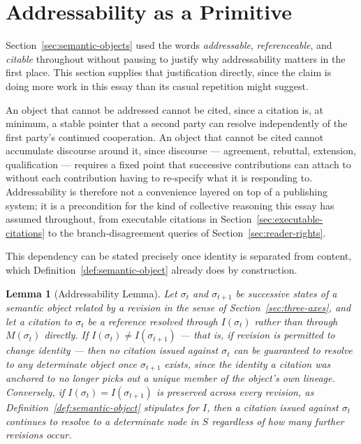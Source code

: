 \documentclass[11pt]{article}
\newtheorem{lemma}[theorem]{Lemma}
\theoremstyle{definition}
\begin{document}
\section{Addressability as a Primitive}
\label{sec:addressability}

Section~\ref{sec:semantic-objects} used the words \emph{addressable}, \emph{referenceable}, and \emph{citable} throughout without pausing to justify why addressability matters in the first place. This section supplies that justification directly, since the claim is doing more work in this essay than its casual repetition might suggest.

An object that cannot be addressed cannot be cited, since a citation is, at minimum, a stable pointer that a second party can resolve independently of the first party's continued cooperation. An object that cannot be cited cannot accumulate discourse around it, since discourse --- agreement, rebuttal, extension, qualification --- requires a fixed point that successive contributions can attach to without each contribution having to re-specify what it is responding to. Addressability is therefore not a convenience layered on top of a publishing system; it is a precondition for the kind of collective reasoning this essay has assumed throughout, from executable citations in Section~\ref{sec:executable-citations} to the branch-disagreement queries of Section~\ref{sec:reader-rights}.

This dependency can be stated precisely once identity is separated from content, which Definition~\ref{def:semantic-object} already does by construction.

\begin{lemma}[Addressability Lemma]
\label{lem:addressability}
Let $\sigma_t$ and $\sigma_{t+1}$ be successive states of a semantic object related by a revision in the sense of Section~\ref{sec:three-axes}, and let a citation to $\sigma_t$ be a reference resolved through $I(\sigma_t)$ rather than through $M(\sigma_t)$ directly. If $I(\sigma_t) \neq I(\sigma_{t+1})$ --- that is, if revision is permitted to change identity --- then no citation issued against $\sigma_t$ can be guaranteed to resolve to any determinate object once $\sigma_{t+1}$ exists, since the identity a citation was anchored to no longer picks out a unique member of the object's own lineage. Conversely, if $I(\sigma_t) = I(\sigma_{t+1})$ is preserved across every revision, as Definition~\ref{def:semantic-object} stipulates for $I$, then a citation issued against $\sigma_t$ continues to resolve to a determinate node in $S$ regardless of how many further revisions occur.
\end{lemma}
\end{document}
